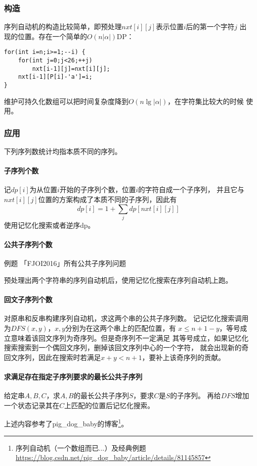 \subsubsection{构造}
序列自动机的构造比较简单，即预处理$nxt[i][j]$表示位置$i$后的第一个字符$j$
出现的位置。存在一个简单的$O(n|\alpha|)$DP：
\begin{lstlisting}
for(int i=n;i>=1;--i) {
    for(int j=0;j<26;++j)
        nxt[i-1][j]=nxt[i][j];
    nxt[i-1][P[i]-'a']=i;
}
\end{lstlisting}

维护可持久化数组可以把时间复杂度降到$O(n\lg |\alpha|)$，在字符集比较大的时候
使用。
\subsubsection{应用}
下列序列数统计均指本质不同的序列。
\paragraph{子序列个数}
记$dp[i]$为从位置$i$开始的子序列个数，位置$i$的字符自成一个子序列，
并且它与$nxt[i][j]$位置的方案构成了本质不同的子序列，因此有
\begin{displaymath}
    dp[i]=1+\sum_j{dp[nxt[i][j]]}
\end{displaymath}
使用记忆化搜索或者逆序dp。
\paragraph{公共子序列个数}
例题 「FJOI2016」所有公共子序列问题

预处理出两个字符串的序列自动机后，使用记忆化搜索在序列自动机上跑。
\paragraph{回文子序列个数}
对原串和反串构建序列自动机，求这两个串的公共子序列数。
记记忆化搜索调用为$DFS(x,y)$，$x,y$分别为在这两个串上的匹配位置，有
$x\leq n+1-y$，等号成立意味着该回文序列为奇序列。但是奇序列不一定满足
其等号成立，如果记忆化搜索搜索到一个偶回文序列，删掉该回文序列中心的一个字符，
就会出现新的奇回文序列，因此在搜索时若满足$x+y<n+1$，要补上该奇序列的贡献。
\paragraph{求满足存在指定子序列要求的最长公共子序列}
给定串$A,B,C$，求$A,B$的最长公共子序列$S$，要求$C$是$S$的子序列。
再给$DFS$增加一个状态记录其在$C$上匹配的位置后记忆化搜索。

上述内容参考了pig\_dog\_baby的博客\footnote{
    序列自动机（一个数组而已...）及经典例题
    \url{https://blog.csdn.net/pig\_dog\_baby/article/details/81145857}
}。
